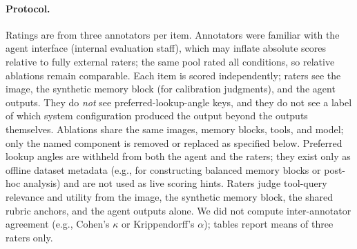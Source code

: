 \documentclass[11pt,a4paper]{article}
\begin{document}
\paragraph{Protocol.}
Ratings are from three annotators per item. Annotators were familiar with the agent interface (internal evaluation staff), which may inflate absolute scores relative to fully external raters; the same pool rated all conditions, so relative ablations remain comparable. Each item is scored independently; raters see the image, the synthetic memory block (for calibration judgments), and the agent outputs. They do \emph{not} see preferred-lookup-angle keys, and they do not see a label of which system configuration produced the output beyond the outputs themselves. Ablations share the same images, memory blocks, tools, and model; only the named component is removed or replaced as specified below. Preferred lookup angles are withheld from both the agent and the raters; they exist only as offline dataset metadata (e.g., for constructing balanced memory blocks or post-hoc analysis) and are not used as live scoring hints. Raters judge tool-query relevance and utility from the image, the synthetic memory block, the shared rubric anchors, and the agent outputs alone. We did not compute inter-annotator agreement (e.g., Cohen's $\kappa$ or Krippendorff's $\alpha$); tables report means of three raters only.
\end{document}
